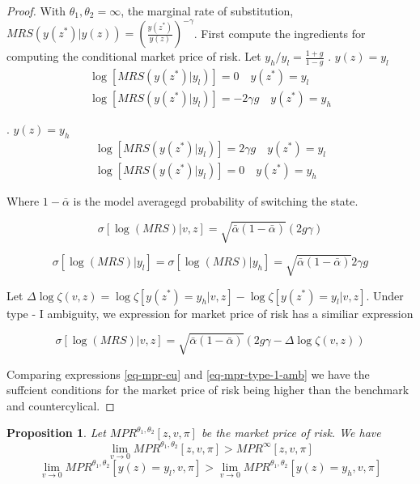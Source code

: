 \documentclass[12pt]{article}
\newtheorem{proposition}{Proposition}
\begin{document}
\begin{proof}
With $\theta_1,\theta_2=\infty$, the marginal rate of substitution, $MRS(y(z^*)|y(z)) = \left(\frac{y(z^*)}{y(z)}\right)^{-\gamma}$. First compute the ingredients for computing the conditional market price of risk. Let $y_h/y_l=\frac{1+g}{1-g}$
. $y(z)=y_l$
\begin{align}
\log[MRS(y(z^*)| y_l)]=0 \quad y(z^*)=y_l \\
\log[MRS(y(z^*)| y_l)]=-2\gamma g \quad y(z^*)=y_h 
\end{align}

. $y(z)=y_h$
\begin{align}
\log[MRS(y(z^*)| y_l)]= 2\gamma g\quad y(z^*)=y_l \\
\log[MRS(y(z^*)| y_l)]=0 \quad y(z^*)=y_h 
\end{align}

Where $1-\bar{\alpha}$ is the model averagegd  probability of switching the state. 

\begin{equation}
\label{eq-mpr-eu}
\sigma[\log(MRS)| v,z]= \sqrt{\bar{\alpha} (1-\bar{\alpha})} (2g\gamma)
\end{equation}


\[\sigma[\log(MRS)| y_l]= \sigma[\log(MRS)| y_h]=\sqrt{\bar{\alpha} (1-\bar{\alpha})}2\gamma g \]

Let $\Delta \log \zeta(v,z)= \log \zeta[y(z^*)=y_h|v,z]- \log \zeta[y(z^*)=y_l|v,z]$. Under type - I ambiguity, we expression for market price of risk has a similiar expression

\begin{equation}
\label{eq-mpr-type-1-amb}
\sigma[\log(MRS)| v,z]= \sqrt{\bar{\alpha} (1-\bar{\alpha})} (2g\gamma -\Delta \log \zeta(v,z) )
\end{equation}

Comparing expressions \ref{eq-mpr-eu} and  \ref{eq-mpr-type-1-amb} we have the suffcient conditions for the market price of risk being higher than the benchmark and countercylical.

\end{proof}


\begin{proposition}
\label{propo-mpr}
Let $MPR^{\theta_1,\theta_2}[z,v,\pi]$ be the market price of risk. We have 
\[\lim_{v\to0} MPR^{\theta_1,\theta_2}[z,v,\pi] >MPR^{\infty}[z,v,\pi] \]
\[\lim_{v\to0} MPR^{\theta_1,\theta_2}[y(z)=y_l,v,\pi] > \lim_{v\to0} MPR^{\theta_1,\theta_2}[y(z)=y_h,v,\pi] \]
\end{proposition}
\end{document}
